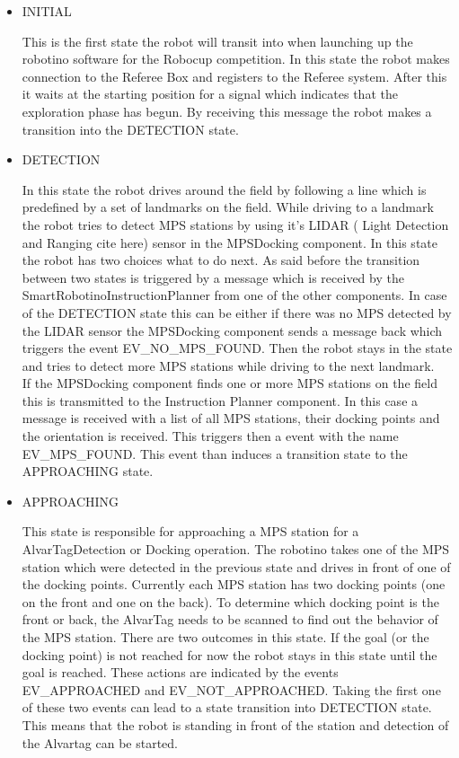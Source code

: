 \begin{itemize}

\item INITIAL 

This is the first state the robot will transit into when launching up the robotino software for the Robocup competition. In this state the robot makes connection to the Referee Box and registers to the Referee system. After this it waits at the starting position for a signal which indicates that the exploration phase has begun. By receiving this message the robot makes a transition into the DETECTION state.  


\item DETECTION

In this state the robot drives around the field by following a line which is predefined by a set of landmarks on the field. While driving to a landmark the robot tries to detect MPS stations by using it's LIDAR ( Light Detection and Ranging cite here) sensor in the MPSDocking component. In this state the robot has two choices what to do next. As said before the transition between two states is triggered by a message which is received by the SmartRobotinoInstructionPlanner from one of the other components. In case of the DETECTION state this can be either if there was no MPS detected by the LIDAR sensor the MPSDocking component sends a message back which triggers the event EV\_NO\_MPS\_FOUND. Then the robot stays in the state and tries to detect more MPS stations while driving to the next landmark.  \\

If the MPSDocking component finds one or more MPS stations on the field this is transmitted to the Instruction Planner component. In this case a message is received with a list of all MPS stations, their docking points and the orientation is received. This triggers then a event with the name EV\_MPS\_FOUND. This event than induces a transition state to the APPROACHING state. 

\item APPROACHING 

This state is responsible for approaching a MPS station for a AlvarTagDetection or Docking operation. The robotino takes one of the MPS station which were detected in the previous state and drives in front of one of the docking points. Currently each MPS station has two docking points (one on the front and one on the back). To determine which docking point is the front or back, the AlvarTag needs to be scanned to find out the behavior of the MPS station. There are two outcomes in this state. If the goal (or the docking point) is not reached for now the robot stays in this state until the goal is reached. These actions are indicated by the events EV\_APPROACHED and EV\_NOT\_APPROACHED. Taking the first one of these two events can lead to a state transition into DETECTION state. This means that the robot is standing in front of the station and detection of the Alvartag can be started. 



\end{itemize}
